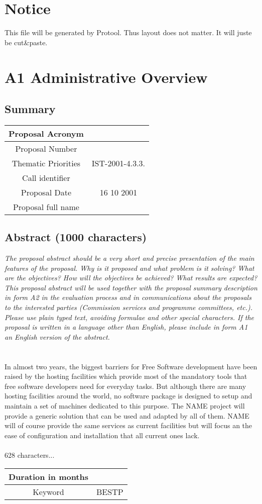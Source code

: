 \documentclass[a4paper,11pt]{report}
\begin{document}
\section*{Notice}
This file will be generated by Protool. Thus layout does not matter. It will
juste be cut\&paste.
\section*{A1 Administrative Overview}
\subsection*{Summary}
\begin{tabular}{|c|c|}
\hline
Proposal Acronym &  \\ \hline
Proposal Number &  \\ \hline
Thematic Priorities & IST-2001-4.3.3. \\ \hline
Call identifier & \\ \hline
Proposal Date & 16 10 2001 \\ \hline
Proposal full name & \\ \hline
\end{tabular}
\subsection*{Abstract (1000 characters)}
\textit{The proposal abstract should be a very short and precise presentation
of the main features of the proposal. Why is it proposed and what problem is it
solving? What are the objectives? How will the objectives be achieved? What
results are expected? This proposal abstract will be used together with the
proposal summary description in form A2 in the evaluation process and in
communications about the proposals to the interested parties (Commission
services and programme committees, etc.). Please use plain typed text, avoiding
formulae and other special characters. If the proposal is written in a language
other than English, please include in form A1 an English version of the
abstract.} \\ \\ \\
In almost two years, the biggest barriers for Free Software development have
been raised by the hosting facilities which provide most of the mandatory tools
that free software developers need for everyday tasks. But although there are
many hosting facilities around the world, no software package is designed to
setup and maintain a set of machines dedicated to this purpose. The NAME
project will provide a generic solution that can be used and adapted by all of
them. NAME will of course provide the same services as current facilities but
will focus an the ease of configuration and installation that all current ones
lack.
\\ \\ 
628 characters...
\begin{tabular}{|c|c|}
\hline
Duration in months & \\ \hline
Keyword & BESTP \\ \hline
\end{tabular}
\end{document}
